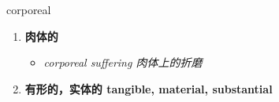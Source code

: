 
\begin{frame}
{\huge corporeal}
\begin{center}
\begin{enumerate}\Large
  \item \textbf{肉体的}
  \begin{itemize}
    \item \em{\Large{corporeal suffering 肉体上的折磨}}
  \end{itemize}
  \item \textbf{有形的，实体的 tangible, material, substantial}
\end{enumerate}
\end{center}
\end{frame}
